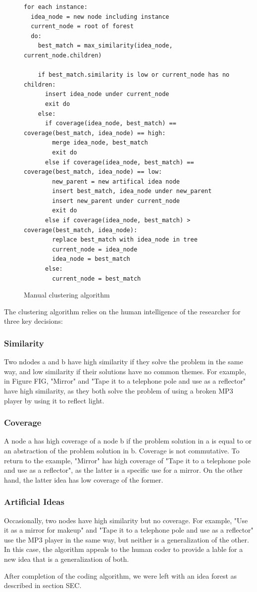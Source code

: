 \begin{figure}[h!]
\small
\begin{verbatim}
for each instance:
  idea_node = new node including instance
  current_node = root of forest
  do:
    best_match = max_similarity(idea_node, current_node.children)

    if best_match.similarity is low or current_node has no children:
      insert idea_node under current_node
      exit do
    else:
      if coverage(idea_node, best_match) == coverage(best_match, idea_node) == high:
        merge idea_node, best_match
        exit do
      else if coverage(idea_node, best_match) == coverage(best_match, idea_node) == low:
        new_parent = new artifical idea node
        insert best_match, idea_node under new_parent
        insert new_parent under current_node
        exit do
      else if coverage(idea_node, best_match) > coverage(best_match, idea_node):
        replace best_match with idea_node in tree
        current_node = idea_node
        idea_node = best_match
      else:
        current_node = best_match
\end{verbatim}
\caption{Manual clustering algorithm}
\label{fig:cluseringalg}
\end{figure}

The clustering algorithm relies on the human intelligence of the researcher for three key decisions:

\subsubsection{Similarity}
Two ndodes a and b have high similarity if they solve the problem in the same way, and low similarity if their solutions have no common themes. For example, in Figure FIG, "Mirror" and "Tape it to a telephone pole and use as a reflector" have high similarity, as they both solve the problem of using a broken MP3 player by using it to reflect light.

\subsubsection{Coverage}
A node a has high coverage of a node b if the problem solution in a is equal to or an abstraction of the problem solution in b. Coverage is not commutative. To return to the example, "Mirror" has high coverage of "Tape it to a telephone pole and use as a reflector", as the latter is a specific use for a mirror. On the other hand, the latter idea has low coverage of the former.

\subsubsection{Artificial Ideas}
Occasionally, two nodes have high similarity but no coverage. For example, "Use it as a mirror for makeup" and "Tape it to a telephone pole and use as a reflector" use the MP3 player in the same way, but neither is a generalization of the other. In this case, the algorithm appeals to the human coder to provide a lable for a new idea that is a generalization of both.

After completion of the coding algorithm, we were left with an idea forest as described in section SEC.